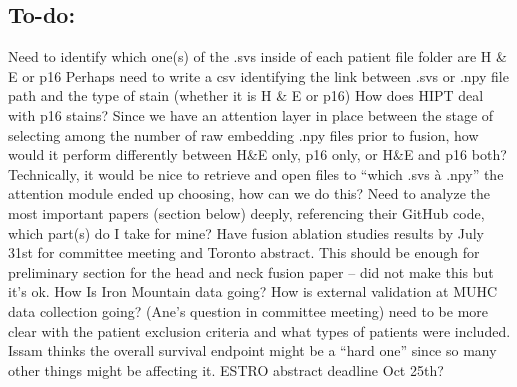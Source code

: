 \documentclass{article}%
\begin{document}
\subsection{To{-}do:}%
\label{subsec:To{-}do}%

%
Need to identify which one(s) of the .svs inside of each patient file folder are H \& E  or p16%
\newline%
\newline%
%
Perhaps need to write a csv identifying the link between .svs or .npy file path and the type of stain (whether it is H \& E or p16) %
\newline%
\newline%
%
How does HIPT deal with p16 stains?%
\newline%
\newline%
%
Since we have an attention layer in place between the stage of selecting among the number of raw embedding .npy files prior to fusion, how would it perform differently between H\&E only, p16 only, or H\&E and p16 both? Technically, it would be nice to retrieve and open files to “which .svs à .npy” the attention module ended up choosing, how can we do this? %
\newline%
\newline%
%
Need to analyze the most important papers (section below) deeply, referencing their GitHub code, which part(s) do I take for mine? %
\newline%
\newline%
%
Have fusion ablation studies results by July 31st for committee meeting and Toronto abstract. This should be enough for preliminary section for the head and neck fusion paper – did not make this but it’s ok. %
\newline%
\newline%
%
How Is Iron Mountain data going?%
\newline%
\newline%
%
How is external validation at MUHC data collection going? %
\newline%
\newline%
%
(Ane’s question in committee meeting) need to be more clear with the patient exclusion criteria and what types of patients were included. Issam thinks the overall survival endpoint might be a “hard one” since so many other things might be affecting it. %
\newline%
\newline%
%
ESTRO abstract deadline Oct 25th? %
\newline%
\newline%
%
%
\newline%
\newline%
%
\end{document}
